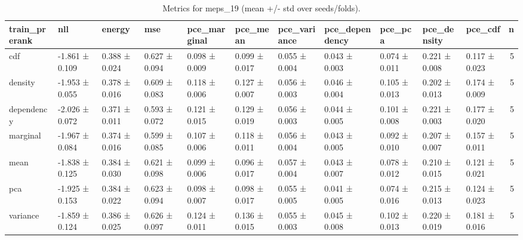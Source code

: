 \begin{table}
\caption{Metrics for meps_19 (mean +/- std over seeds/folds).}
\label{tab:metrics_summary_meps_19}
\begin{tabular}{lllllllllllr}
\toprule
train_prerank & nll & energy & mse & pce_marginal & pce_mean & pce_variance & pce_dependency & pce_pca & pce_density & pce_cdf & n \\
\midrule
cdf & -1.861 ± 0.109 & 0.388 ± 0.024 & 0.627 ± 0.094 & 0.098 ± 0.009 & 0.099 ± 0.017 & 0.055 ± 0.004 & 0.043 ± 0.003 & 0.074 ± 0.011 & 0.221 ± 0.008 & 0.117 ± 0.023 & 5 \\
density & -1.953 ± 0.055 & 0.378 ± 0.016 & 0.609 ± 0.083 & 0.118 ± 0.006 & 0.127 ± 0.007 & 0.056 ± 0.003 & 0.046 ± 0.004 & 0.105 ± 0.013 & 0.202 ± 0.013 & 0.174 ± 0.009 & 5 \\
dependency & -2.026 ± 0.072 & 0.371 ± 0.011 & 0.593 ± 0.072 & 0.121 ± 0.015 & 0.129 ± 0.019 & 0.056 ± 0.003 & 0.044 ± 0.005 & 0.101 ± 0.008 & 0.221 ± 0.003 & 0.177 ± 0.020 & 5 \\
marginal & -1.967 ± 0.084 & 0.374 ± 0.016 & 0.599 ± 0.085 & 0.107 ± 0.006 & 0.118 ± 0.011 & 0.056 ± 0.004 & 0.043 ± 0.005 & 0.092 ± 0.010 & 0.207 ± 0.007 & 0.157 ± 0.011 & 5 \\
mean & -1.838 ± 0.125 & 0.384 ± 0.030 & 0.621 ± 0.098 & 0.099 ± 0.006 & 0.096 ± 0.017 & 0.057 ± 0.004 & 0.043 ± 0.007 & 0.078 ± 0.012 & 0.210 ± 0.015 & 0.121 ± 0.021 & 5 \\
pca & -1.925 ± 0.153 & 0.384 ± 0.022 & 0.623 ± 0.094 & 0.098 ± 0.007 & 0.098 ± 0.017 & 0.055 ± 0.005 & 0.041 ± 0.005 & 0.074 ± 0.016 & 0.215 ± 0.013 & 0.124 ± 0.023 & 5 \\
variance & -1.859 ± 0.124 & 0.386 ± 0.025 & 0.626 ± 0.097 & 0.124 ± 0.011 & 0.136 ± 0.015 & 0.055 ± 0.003 & 0.045 ± 0.008 & 0.102 ± 0.013 & 0.220 ± 0.019 & 0.181 ± 0.016 & 5 \\
\bottomrule
\end{tabular}
\end{table}
